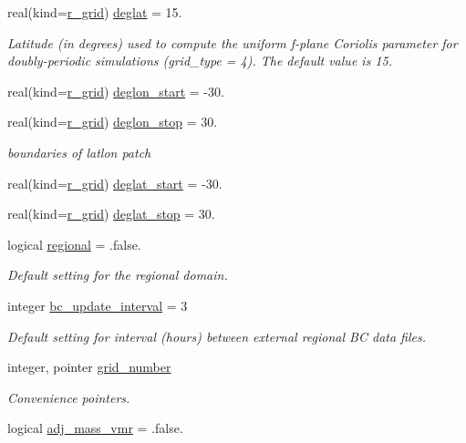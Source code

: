 \begin{DoxyCompactItemize}
real(kind=\hyperlink{classfv__arrays__mod_ab0ba8527d270f349a84fa0a330be1923}{r\-\_\-grid}) \hyperlink{structfv__arrays__mod_1_1fv__flags__type_a2ec7d7cffa2d1b29a11b25d9b1410af4}{deglat} = 15.
\begin{DoxyCompactList}\small\item\em Latitude (in degrees) used to compute the uniform f-\/plane Coriolis parameter for doubly-\/periodic simulations (grid\-\_\-type = 4). The default value is 15. \end{DoxyCompactList}\item 
real(kind=\hyperlink{classfv__arrays__mod_ab0ba8527d270f349a84fa0a330be1923}{r\-\_\-grid}) \hyperlink{structfv__arrays__mod_1_1fv__flags__type_aa71d52d628975cba5995e1e17069c776}{deglon\-\_\-start} = -\/30.
\item 
real(kind=\hyperlink{classfv__arrays__mod_ab0ba8527d270f349a84fa0a330be1923}{r\-\_\-grid}) \hyperlink{structfv__arrays__mod_1_1fv__flags__type_a0a52ce1af7414411437fd97e3fbad4d9}{deglon\-\_\-stop} = 30.
\begin{DoxyCompactList}\small\item\em boundaries of latlon patch \end{DoxyCompactList}\item 
real(kind=\hyperlink{classfv__arrays__mod_ab0ba8527d270f349a84fa0a330be1923}{r\-\_\-grid}) \hyperlink{structfv__arrays__mod_1_1fv__flags__type_a241a60bdb1c3513da1bbe1964d689347}{deglat\-\_\-start} = -\/30.
\item 
real(kind=\hyperlink{classfv__arrays__mod_ab0ba8527d270f349a84fa0a330be1923}{r\-\_\-grid}) \hyperlink{structfv__arrays__mod_1_1fv__flags__type_a3433f6e5c4398683f9ce32f3c2e2e357}{deglat\-\_\-stop} = 30.
\item 
logical \hyperlink{structfv__arrays__mod_1_1fv__flags__type_a4ce53164805b0d12f7f4f44ca7dc8baf}{regional} = .false.
\begin{DoxyCompactList}\small\item\em Default setting for the regional domain. \end{DoxyCompactList}\item 
integer \hyperlink{structfv__arrays__mod_1_1fv__flags__type_a6504af6e717d93ba2f8ffbbfbed15c07}{bc\-\_\-update\-\_\-interval} = 3
\begin{DoxyCompactList}\small\item\em Default setting for interval (hours) between external regional B\-C data files. \end{DoxyCompactList}\item 
integer, pointer \hyperlink{structfv__arrays__mod_1_1fv__flags__type_aa5c3b16f742d10f6de7d4cffb401e7d1}{grid\-\_\-number}
\begin{DoxyCompactList}\small\item\em Convenience pointers. \end{DoxyCompactList}\item 
logical \hyperlink{structfv__arrays__mod_1_1fv__flags__type_a4042ed7bbea950c7af4a3efb709218e4}{adj\-\_\-mass\-\_\-vmr} = .false.
\end{DoxyCompactItemize}


